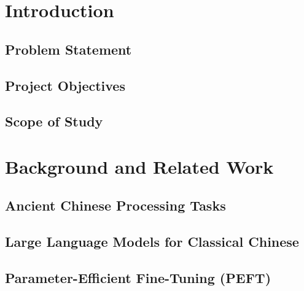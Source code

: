 \chapter{Introduction}

\section{Problem Statement}

\section{Project Objectives}

\section{Scope of Study}

\chapter{Background and Related Work}

\section{Ancient Chinese Processing Tasks}

\section{Large Language Models for Classical Chinese}

\section{Parameter-Efficient Fine-Tuning (PEFT)}
